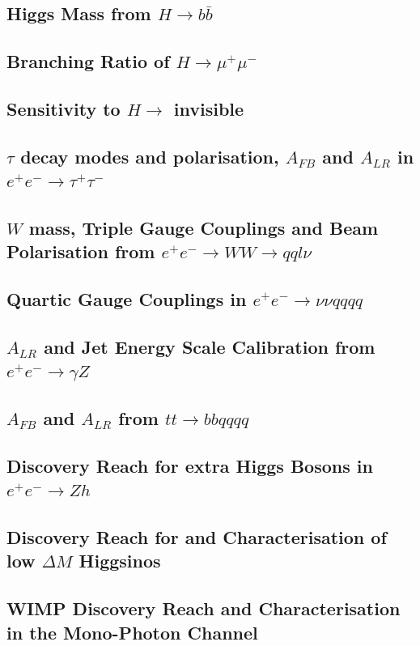 \subsection{Higgs Mass from $H \to b\bar{b}$}
\subsection{Branching Ratio of $H \to \mu^+\mu^-$}
\subsection{Sensitivity to $H \to $ invisible}
\subsection{$\tau$ decay modes and polarisation, $A_{FB}$ and $A_{LR}$ in $e^+e^- \to \tau^+\tau^-$}
\subsection{$W$ mass, Triple Gauge Couplings and Beam Polarisation from $e^+e^- \to WW \to qql\nu$}
\subsection{Quartic Gauge Couplings in $e^+e^- \to \nu\nu qqqq$}
\subsection{$A_{LR}$ and Jet Energy Scale Calibration from $e^+e^- \to \gamma Z$}
\subsection{$A_{FB}$ and $A_{LR}$ from $tt \to bb qqqq$}

\subsection{Discovery Reach for extra Higgs Bosons in $e^+e^- \to Zh$}
\subsection{Discovery Reach for and Characterisation of low $\Delta M$ Higgsinos}
\subsection{WIMP Discovery Reach and Characterisation in the Mono-Photon Channel}

